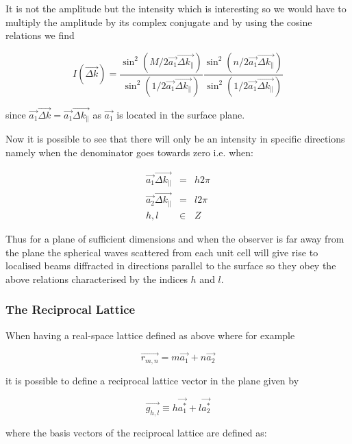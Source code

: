 It is not the amplitude but the intensity which is interesting so we would have to multiply the amplitude by its complex conjugate and by using the cosine relations we find

\begin{equation}
I(\vec{\Delta k})=\frac{\sin^2\left(M/2\vec{a_1} \vec{\Delta k_{\parallel}}\right)}{\sin^2\left(1/2\vec{a_1}\vec{\Delta k_{\parallel}}\right)}\frac{\sin^2\left(n/2\vec{a_1}\vec{\Delta k_{\parallel}}\right)}{\sin^2\left(1/2\vec{a_1}\vec{\Delta k_{\parallel}}\right)}
\end{equation}

\noindent since $\vec{a_1}\vec{\Delta k}=\vec{a_1}\vec{\Delta k_{\parallel}}$ as $\vec{a_1}$ is located in the surface plane.

Now it is possible to see that there will only be an intensity in specific directions namely when the denominator goes towards zero i.e. when:

\begin{eqnarray}
\vec{a_1}\vec{\Delta k_{\parallel}}	& =	& h2\pi \\
\vec{a_2}\vec{\Delta k_{\parallel}} & =	& l2\pi \\
h,l	& \in	& Z
\end{eqnarray}

Thus for a plane of sufficient dimensions and when the observer is far away from the plane the spherical waves scattered from each unit cell will give rise to localised beams diffracted in directions parallel to the surface so they obey the above relations characterised by the indices $h$ and $l$.

\subsubsection{The Reciprocal Lattice}
When having a real-space lattice defined as above where for example

\begin{equation}
\vec{r_{m,n}}=m\vec{a_1}+n\vec{a_2}
\end{equation}

\noindent it is possible to define a reciprocal lattice vector in the plane given by

\begin{equation}
\vec{g_{h,l}}\equiv h\vec{a_1^*}+l\vec{a_2^*}
\end{equation}

\noindent where the basis vectors of the reciprocal lattice are defined as:

